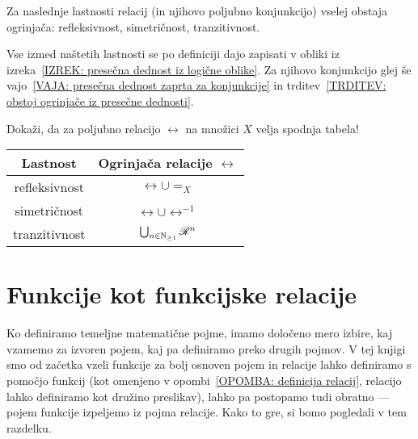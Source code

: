 		\begin{posledica}\label{POSLEDICA: obstoj ogrinjač}
			Za naslednje lastnosti relacij (in njihovo poljubno konjunkcijo) vselej obstaja ogrinjača: refleksivnost, simetričnost, tranzitivnost.
		\end{posledica}
		
		\begin{dokaz}
			Vse izmed naštetih lastnosti se po definiciji dajo zapisati v obliki iz izreka~\ref{IZREK: presečna dednost iz logične oblike}. Za njihovo konjunkcijo glej še vajo~\ref{VAJA: presečna dednost zaprta za konjunkcije} in trditev~\ref{TRDITEV: obstoj ogrinjače iz presečne dednosti}.
		\end{dokaz}
		
		\begin{vaja}
			Dokaži, da za poljubno relacijo $\rel$ na množici $X$ velja spodnja tabela!
			\begin{center}
				\begin{tabular}{|c|c|}
					\hline
					\textbf{Lastnost} & \textbf{Ogrinjača relacije $\rel$} \\
					\hline
					refleksivnost & $\rel \cup =_X$ \\
					simetričnost & $\rel \cup \rel^{-1}$ \\
					tranzitivnost & $\bigcup_{n \in \NN_{\geq 1}} \rel^n$ \\
					\hline
				\end{tabular}
			\end{center}
		\end{vaja}
		
	
	
	\section{Funkcije kot funkcijske relacije}\label{RAZDELEK: Funkcije kot funkcijske relacije}
	
		Ko definiramo temeljne matematične pojme, imamo določeno mero izbire, kaj vzamemo za izvoren pojem, kaj pa definiramo preko drugih pojmov. V tej knjigi smo od začetka vzeli funkcije za bolj osnoven pojem in relacije lahko definiramo s pomočjo funkcij (kot omenjeno v opombi~\ref{OPOMBA: definicija relacij}, relacijo lahko definiramo kot družino preslikav), lahko pa postopamo tudi obratno --- pojem funkcije izpeljemo iz pojma relacije. Kako to gre, si bomo pogledali v tem razdelku.
		
